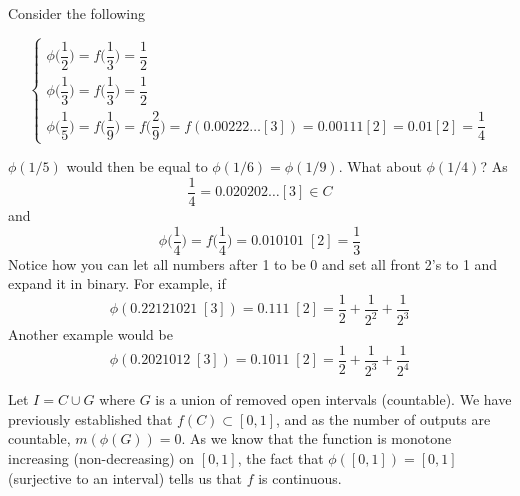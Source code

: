 \begin{ex}
Consider the following
\begin{spacing}{2}
\[\begin{cases}
\phi \Big(\dfrac{1}{2}\Big)=f \Big(\dfrac{1}{3}\Big)=\dfrac{1}{2}\\
\phi \Big(\dfrac{1}{3}\Big)=f\Big(\dfrac{1}{3}\Big)=\dfrac{1}{2}\\
\phi\Big(\dfrac{1}{5}\Big)=f \Big(\dfrac{1}{9}\Big)=f \Big(\dfrac{2}{9}\Big)=f (0.00222\ldots [3])=0.00111[2]=0.01[2]=\dfrac{1}{4}
\end{cases}\]
\end{spacing}
$\phi (1/5)$ would then be equal to $\phi (1/6)=\phi (1/9)$. What about $\phi (1/4)$? As
\[\dfrac{1}{4}=0.020202\ldots [3]\in C\]
and
\[\phi \Big(\dfrac{1}{4}\Big)=f\Big(\dfrac{1}{4}\Big)=0.010101\;[2]=\dfrac{1}{3}\]
Notice how you can let all numbers after 1 to be 0 and set all front 2's to 1 and expand it in binary. For example, if
\[\phi (0.22121021\;[3])=0.111\;[2]=\dfrac{1}{2}+\dfrac{1}{2^2}+\dfrac{1}{2^3}\]
Another example would be
\[\phi (0.2021012\;[3])=0.1011\;[2]=\dfrac{1}{2}+\dfrac{1}{2^3}+\dfrac{1}{2^{4}}\]
\end{ex}
\vspace{2ex}
\begin{rmk}
Let $I=C\cup G$ where $G$ is a union of removed open intervals (countable). We have previously established that $f (C)\subset [0,1]$, and as the number of outputs are countable, $m(\phi  (G))=0$. As we know that the function is monotone increasing (non-decreasing) on $[0,1]$, the fact that $\phi ([0,1])=[0,1]$ (surjective to an interval) tells us that $f$ is continuous.
\end{rmk}
\vspace{2ex}

